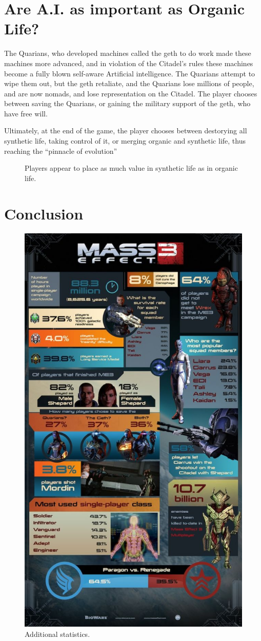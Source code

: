 \documentclass[journal]{IEEEtran}
\begin{document}
\section{Are A.I. as important as Organic Life?}
The Quarians, who developed machines called the geth to do work made these
machines more advanced, and in violation of the Citadel's rules these machines
become a fully blown self-aware Artificial intelligence. The Quarians attempt to wipe them out, but the geth retaliate, and the Quarians lose millions of people, and are now nomads, and lose representation on the Citadel.
The player chooses between saving the Quarians, or gaining the military support of the geth, who have free will.

Ultimately, at the end of the game, the player chooses between destorying
all synthetic life, taking control of it, or merging organic and synthetic life,
thus reaching the ``pinnacle of evolution''\cite{me}
\begin{figure}
 \begin{adjustbox}{width=.35\textwidth}
 \end{adjustbox}
 \caption{Players appear to place as much value in synthetic life as in organic life. \cite{ea}}
\end{figure}

\section{Conclusion}
\lipsum[7]
\nocite{*}



\begin{figure}[]
 \includegraphics[width=.45\textwidth]{stat.jpg}
 \caption{Additional statistics. \cite{ea}}
\end{figure}
\end{document}
